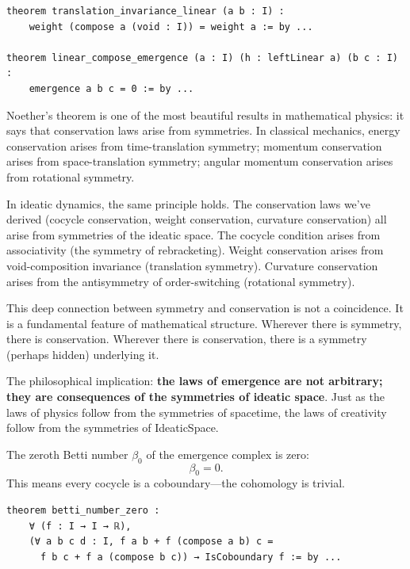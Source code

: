\begin{lstlisting}[caption={Translation invariance (IDT\_v3\_Emergence.lean)}]
theorem translation_invariance_linear (a b : I) :
    weight (compose a (void : I)) = weight a := by ...

theorem linear_compose_emergence (a : I) (h : leftLinear a) (b c : I) :
    emergence a b c = 0 := by ...
\end{lstlisting}

\begin{interpretation}
Noether's theorem is one of the most beautiful results in mathematical physics:
it says that conservation laws arise from symmetries. In classical mechanics,
energy conservation arises from time-translation symmetry; momentum conservation
arises from space-translation symmetry; angular momentum conservation arises
from rotational symmetry.

In ideatic dynamics, the same principle holds. The conservation laws we've
derived (cocycle conservation, weight conservation, curvature conservation)
all arise from symmetries of the ideatic space. The cocycle condition arises
from associativity (the symmetry of rebracketing). Weight conservation arises
from void-composition invariance (translation symmetry). Curvature conservation
arises from the antisymmetry of order-switching (rotational symmetry).

This deep connection between symmetry and conservation is not a coincidence.
It is a fundamental feature of mathematical structure. Wherever there is
symmetry, there is conservation. Wherever there is conservation, there is
a symmetry (perhaps hidden) underlying it.

The philosophical implication: \textbf{the laws of emergence are not arbitrary;
they are consequences of the symmetries of ideatic space}. Just as the laws
of physics follow from the symmetries of spacetime, the laws of creativity
follow from the symmetries of IdeaticSpace.
\end{interpretation}

\begin{theorem}
\label{thm:betti}
The zeroth Betti number $\beta_0$ of the emergence complex is zero:
\[
  \beta_0 = 0.
\]
This means every cocycle is a coboundary---the cohomology is trivial.
\end{theorem}

\begin{lstlisting}[caption={Betti number (IDT\_v3\_Emergence.lean)}]
theorem betti_number_zero :
    ∀ (f : I → I → ℝ),
    (∀ a b c d : I, f a b + f (compose a b) c =
      f b c + f a (compose b c)) → IsCoboundary f := by ...
\end{lstlisting}

